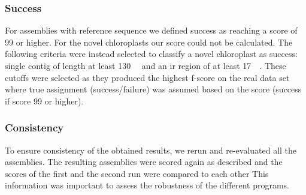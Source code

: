 \documentclass{bmcart}
\begin{document}
\subsubsection*{Success}
For assemblies with reference sequence we defined success as reaching a score of 99 or higher.
For the novel chloroplasts our score could not be calculated.
The following criteria were instead selected to classify a novel chloroplast as success: single contig of length at least \SI{130}{\kilo\basepair{}} and an \gls{ir} region of at least \SI{17}{\kilo\basepair{}}.
These cutoffs were selected as they produced the highest f-score on the real data set where true assignment (success/failure) was assumed based on the score (success if score \num{99} or higher).

\subsubsection*{Consistency}
To ensure consistency of the obtained results, we rerun and re-evaluated all the assemblies. 
The resulting assemblies were scored again as described and the scores of the first and the second run were compared to each other
This information was important to assess the robustness of the different programs.

\end{document}
